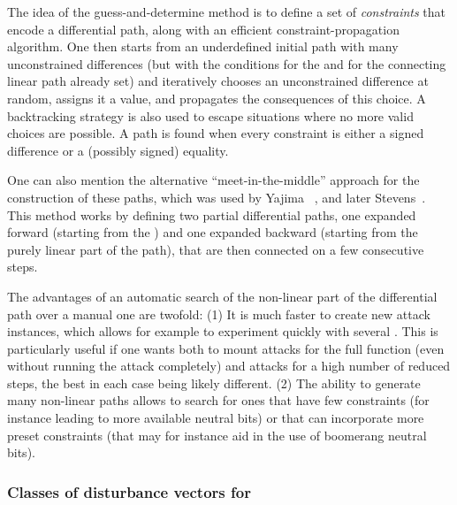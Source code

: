 The idea of the guess-and-determine method is to define a set of \emph{constraints} that encode a differential path, along with an efficient constraint-propagation
algorithm. One then starts from an underdefined initial path with many unconstrained differences (but with the conditions for the \iv and for the connecting
linear path already set) and iteratively chooses an unconstrained difference at random, assigns it a value, and propagates the consequences of this choice.
A backtracking strategy is also used to escape situations where no more valid choices are possible. A path is found when every constraint is either a signed
difference or a (possibly signed) equality.

One can also mention the alternative ``meet-in-the-middle'' approach for the construction of these paths, which was used by Yajima \etal~\cite{DBLP:conf/acisp/YajimaSNISKO07},
and later Stevens~\cite{phdstevens}. This method works by defining two partial differential paths, one expanded forward (\eg starting from the \iv) and one expanded backward
(\eg starting from the purely linear part of the path), that are then connected on a few consecutive steps.

The advantages of an automatic search of the non-linear part of the differential path over a manual one are twofold: (1) It is much faster to create new
attack instances, which allows for example to experiment quickly with several \dvs. This is particularly useful if one wants both to mount
attacks for the full function (even without running the attack completely) and attacks for a high number of reduced steps, the best \dvs in each case
being likely different. (2) The ability to generate many non-linear paths allows to search for ones that have few constraints (for instance leading
to more available neutral bits) or that can incorporate more preset constraints (that may for instance aid in the use of boomerang neutral bits).




\subsubsection{Classes of disturbance vectors for \shaone}
\label{sec:sha1_dvs}

